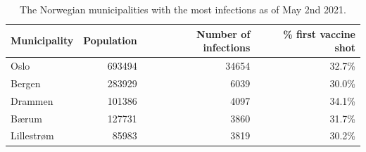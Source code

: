 \begin{table}[H] 
\caption{The Norwegian municipalities with the most infections as of May 2nd 2021. \label{top5norway}}
\begin{tabular}{l r r r}
\toprule
\textbf{Municipality}	& \textbf{Population}	& \textbf{Number of infections} &\textbf{\% first vaccine shot} \\
\midrule
Oslo & 693494 & 34654 & 32.7\%\\
Bergen & 283929 & 6039 & 30.0\%\\
Drammen & 101386 & 4097 & 34.1\%\\
Bærum & 127731 & 3860 & 31.7\%\\
Lillestrøm & 85983 & 3819 & 30.2\%\\
\bottomrule
\end{tabular}
\end{table}
